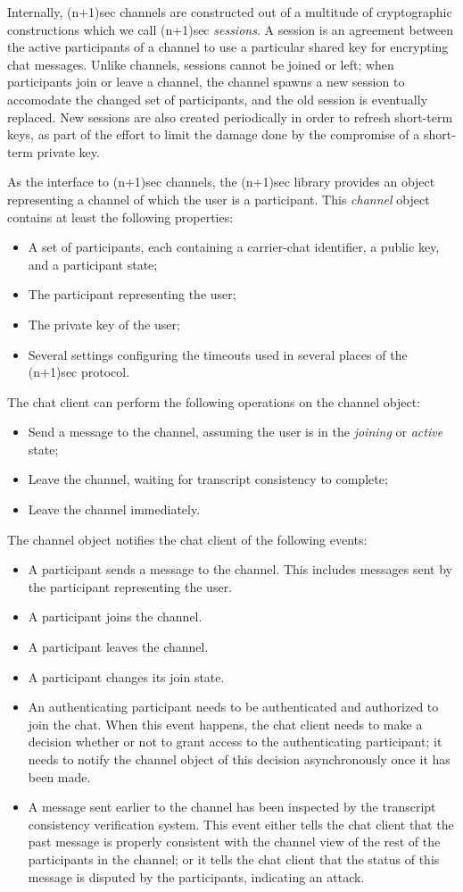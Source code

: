 \documentclass{article}
\begin{document}
Internally, (n+1)sec channels are constructed out of a multitude of cryptographic constructions which we call (n+1)sec \emph{sessions}.
A session is an agreement between the active participants of a channel to use a particular shared key for encrypting chat messages.
Unlike channels, sessions cannot be joined or left; when participants join or leave a channel, the channel spawns a new session to accomodate the changed set of participants, and the old session is eventually replaced.
New sessions are also created periodically in order to refresh short-term keys, as part of the effort to limit the damage done by the compromise of a short-term private key.

As the interface to (n+1)sec channels, the (n+1)sec library provides an object representing a channel of which the user is a participant.
This \emph{channel} object contains at least the following properties:
\begin{itemize}
\item A set of participants, each containing a carrier-chat identifier, a public key, and a participant state;
\item The participant representing the user;
\item The private key of the user;
\item Several settings configuring the timeouts used in several places of the (n+1)sec protocol.
\end{itemize}
The chat client can perform the following operations on the channel object:
\begin{itemize}
\item Send a message to the channel, assuming the user is in the \emph{joining} or \emph{active} state;
\item Leave the channel, waiting for transcript consistency to complete;
\item Leave the channel immediately.
\end{itemize}
The channel object notifies the chat client of the following events:
\begin{itemize}
\item A participant sends a message to the channel. This includes messages sent by the participant representing the user.
\item A participant joins the channel.
\item A participant leaves the channel.
\item A participant changes its join state.
\item An authenticating participant needs to be authenticated and authorized to join the chat. When this event happens, the chat client needs to make a decision whether or not to grant access to the authenticating participant; it needs to notify the channel object of this decision asynchronously once it has been made.
\item A message sent earlier to the channel has been inspected by the transcript consistency verification system. This event either tells the chat client that the past message is properly consistent with the channel view of the rest of the participants in the channel; or it tells the chat client that the status of this message is disputed by the participants, indicating an attack.
\end{itemize}
\end{document}
